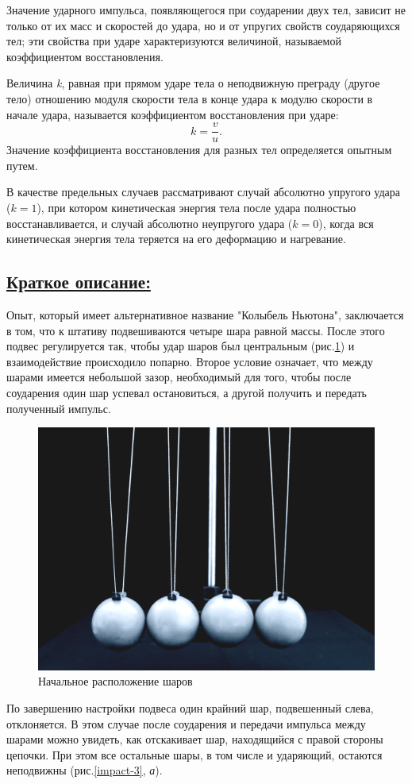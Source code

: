 \documentclass[14pt,a4paper,oneside]{extarticle}	%
\begin{document}
Значение ударного импульса, появляющегося при соударении двух тел, зависит не только от их масс и скоростей до удара, но и от упругих свойств соударяющихся тел; эти свойства при ударе характеризуются величиной, называемой коэффициентом восстановления.

Величина \textit{k}, равная при прямом ударе тела о неподвижную преграду (другое тело) отношению модуля
скорости тела в конце удара к модулю скорости в начале удара, называется коэффициентом восстановления при ударе:
$$
k = \frac{v}{u}.
$$
Значение коэффициента восстановления для разных тел определяется опытным путем.

В качестве предельных случаев рассматривают случай абсолютно упругого удара ($ k=1 $), при котором кинетическая энергия тела после удара полностью восстанавливается, и случай абсолютно неупругого удара ($ k=0 $), когда вся кинетическая энергия тела теряется на его деформацию и нагревание.

\subsection*{\underline{Краткое описание:}}

Опыт, который имеет альтернативное название "Колыбель Ньютона", заключается в том, что к штативу подвешиваются четыре шара равной массы.
После этого подвес регулируется так, чтобы удар шаров был центральным (рис.\ref{impact-2}) и взаимодействие происходило попарно.
Второе условие означает, что между шарами имеется небольшой зазор, необходимый для того, чтобы после соударения один шар успевал остановиться, а другой получить и передать полученный импульс.
\begin{figure}[H]
	\centering 	
	\includegraphics[width=0.6\linewidth]{impact-2.png}
	\caption{Начальное расположение шаров}
	\label{impact-2}
\end{figure}

По завершению настройки подвеса один крайний шар, подвешенный слева, отклоняется.
В этом случае после соударения и передачи импульса между шарами можно увидеть, как отскакивает шар, находящийся с правой стороны цепочки.
При этом все остальные шары, в том числе и ударяющий, остаются неподвижны (рис.\ref{impact-3}, \textit{а}).
\end{document}
